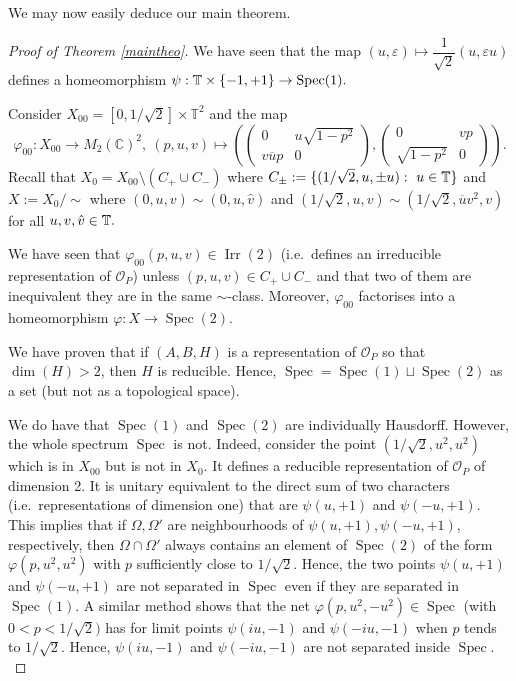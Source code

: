 \documentclass[12pt, a4paper]{amsart}
\def\dim{\operatorname{dim}}
\def\Spec{\operatorname{Spec}}
\def\Irr{\operatorname{Irr}}
\def\C{\mathbb{C}}
\def\T{\mathbb{T}}
\newcommand{\CO}[0]{\mathcal{O}} \newcommand{\CP}[0]{\mathcal{P}}
\numberwithin{equation}{section}
\begin{document}
We may now easily deduce our main theorem.

\begin{proof}[Proof of Theorem \ref{maintheo}]
We have seen that the map $(u,\varepsilon)\mapsto \dfrac{1}{\sqrt 2}(u,\varepsilon u)$ defines a homeomorphism $\psi:\IT\times\{-1,+1\}\to\Spec(1).$

Consider $X_{00}=[0,1/\sqrt 2]\times \T^2$ and the map 
$$\varphi_{00}:X_{00}\to M_2(\C)^2,\  (p,u,v)\mapsto \left(\begin{pmatrix} 0 & u\sqrt{1-p^2}\\ v\overline u p & 0 \end{pmatrix} , \begin{pmatrix}   0 & vp\\ \sqrt{1-p^2} & 0 \end{pmatrix}\right).$$
Recall that $X_0=X_{00}\setminus(C_+\cup C_-)$ where $C_{\pm}:=\{(1/\sqrt 2, u,\pm u):\ u\in\IT\}$ and $X:=X_0/\sim$ where $(0,u,v)\sim (0,u,\hat v)$ and $(1/\sqrt 2, u,v)\sim(1/\sqrt 2, \overline u v^2,v)$ for all $u,v,\hat v\in\mathbb{T}.$

We have seen that $\varphi_{00}(p,u,v)\in \Irr(2)$ (i.e.~defines an irreducible representation of $\CO_P$) unless $(p,u,v)\in C_+\cup C_-$ and that two of them are inequivalent they are in the same $\sim$-class.
Moreover, $\varphi_{00}$ factorises into a homeomorphism $\varphi:X\to\Spec(2).$

We have proven that if $(A,B,H)$ is a representation of $\CO_P$ so that $\dim(H)>2$, then $H$ is reducible.
Hence, $\Spec=\Spec(1)\sqcup \Spec(2)$ as a set (but not as a topological space).

We do have that $\Spec(1)$ and $\Spec(2)$ are individually Hausdorff.
However, the whole spectrum $\Spec$ is not.
Indeed, consider the point $(1/\sqrt 2, u^2,u^2)$ which is in $X_{00}$ but is not in $X_0.$
It defines a reducible representation of $\CO_P$ of dimension 2.
It is unitary equivalent to the direct sum of two characters (i.e.~representations of dimension one) that are $\psi(u,+1)$ and $\psi(-u,+1).$
This implies that if $\Omega,\Omega'$ are neighbourhoods of $\psi(u,+1),\psi(-u,+1)$, respectively, then $\Omega\cap\Omega'$ always contains an element of $\Spec(2)$ of the form $\varphi(p,u^2,u^2)$ with $p$ sufficiently close to $1/\sqrt 2.$
Hence, the two points $\psi(u,+1)$ and $\psi(-u,+1)$ are not separated in $\Spec$ even if they are separated in $\Spec(1).$
A similar method shows that the net $\varphi(p,u^2,-u^2)\in\Spec$ (with $0<p<1/\sqrt 2)$ has for limit points $\psi(iu,-1)$ and $\psi(-iu,-1)$ when $p$ tends to $1/\sqrt 2$. Hence, $\psi(iu,-1)$ and $\psi(-iu,-1)$ are not separated inside $\Spec.$
\end{proof}
\end{document}
